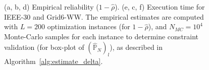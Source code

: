 \begin{figure}[hbt]
\begin{subfigure}{.50\textwidth}
{  }
  \label{fig:grid6time-dd-dro}
\end{subfigure}
\vspace{-7mm}
\caption{(a, b, d) Empirical reliability ($1-\hat{\rho}$). (e, c, f) Execution time for IEEE-30 and Grid6-WW. The empirical estimates are computed with $L = 200$ optimization instances (for $1-\hat{\rho}$), and $N_{MC}=10^4$ Monte-Carlo samples for each instance to determine constraint validation (for box-plot of $(\hat{\mathbb{P}}_N)_l$), as described in Algorithm~\ref{alg:estimate_delta}.  
}
\label{fig:dyn_ieee118}
\end{figure}
